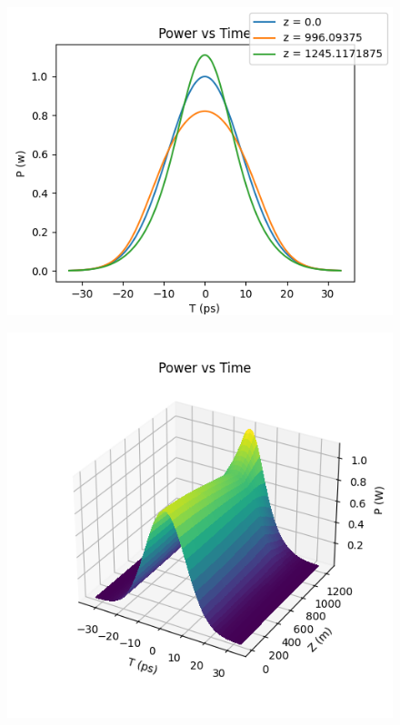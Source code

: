 \documentclass[10pt, a4paper, twocolumn]{article} %
\begin{document}
\begin{figure}
    \includegraphics[width=\linewidth]{plots/compPowerFL.png}
    \caption{}
    \label{compPowerFL}
\end{figure}

\begin{figure}
    \includegraphics[width=\linewidth]{plots/compPower3D.png}
    \caption{}
    \label{compPower3D}
\end{figure}
\end{document}
